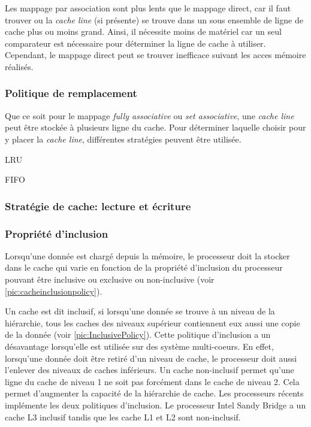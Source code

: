Les mappage par association sont plus lents que le mappage direct, car il faut trouver ou la \textit{cache line} (si présente) se trouve dans un sous ensemble de ligne de cache plus ou moins grand. Ainsi, il nécessite moins de matériel car un seul comparateur est nécessaire pour déterminer la ligne de cache à utiliser. Cependant, le mappage direct peut se trouver  inefficace suivant les acces mémoire réalisés.



\subsubsection{Politique de remplacement}
Que ce soit pour le mappage \textit{fully associative} ou \textit{set associative}, une \textit{cache line} peut être stockée à plusieurs ligne du cache. Pour déterminer laquelle choisir pour y placer la \textit{cache line}, différentes stratégies peuvent être utilisée. 

LRU

FIFO




\subsubsection{Stratégie de cache: lecture et écriture}









\subsubsection{Propriété d'inclusion}
Lorsqu'une donnée est chargé depuis la mémoire, le processeur doit la stocker dans le cache qui varie en fonction de la propriété d'inclusion du processeur pouvant être inclusive ou exclusive ou non-inclusive (voir \autoref{pic:cacheinclusionpolicy}).

Un cache est dit inclusif, si lorsqu'une donnée se trouve à un niveau de la hiérarchie, tous les caches des niveaux supérieur contiennent eux aussi une copie de la donnée (voir \autoref{pic:InclusivePolicy}). Cette politique d'inclusion a un désavantage lorsqu'elle est utilisée sur des système multi-coeurs. En effet, lorsqu'une donnée doit être retiré d'un niveau de cache, le processeur doit aussi l'enlever des niveaux de caches inférieurs. 
Un cache non-inclusif permet qu'une ligne du cache de niveau 1 ne soit pas forcément dans le cache de niveau 2. Cela permet d'augmenter la capacité de la hiérarchie de cache. Les processeurs récents implémente les deux politiques d'inclusion. Le processeur Intel Sandy Bridge a un cache L3 inclusif tandis que les cache L1 et L2 sont non-inclusif.

